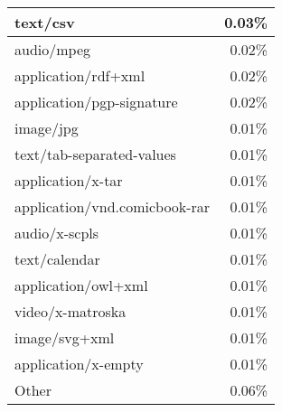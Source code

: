 \begin{center}
\begin{tabular*}{\textwidth}{l@{\extracolsep{\fill}}r}
	\hline
	text/csv			&	0.03\% \\
	\hline
	audio/mpeg			&	0.02\% \\
	\hline
	application/rdf+xml	&	0.02\% \\
	\hline
	application/pgp-signature		&	0.02\% \\
	\hline
	image/jpg			&	0.01\% \\
	\hline
	text/tab-separated-values		&	0.01\% \\
	\hline
	application/x-tar	&	0.01\% \\
	\hline
	application/vnd.comicbook-rar	&	0.01\% \\
	\hline
	audio/x-scpls		&	0.01\% \\
	\hline
	text/calendar		&	0.01\% \\
	\hline
	application/owl+xml	&	0.01\% \\
	\hline
	video/x-matroska	&	0.01\% \\
	\hline
	image/svg+xml		&	0.01\% \\
	\hline
	application/x-empty	&	0.01\% \\
	\hline
	Other				&	0.06\% \\
	\hline
\end{tabular*}
\end{center}
\fi

